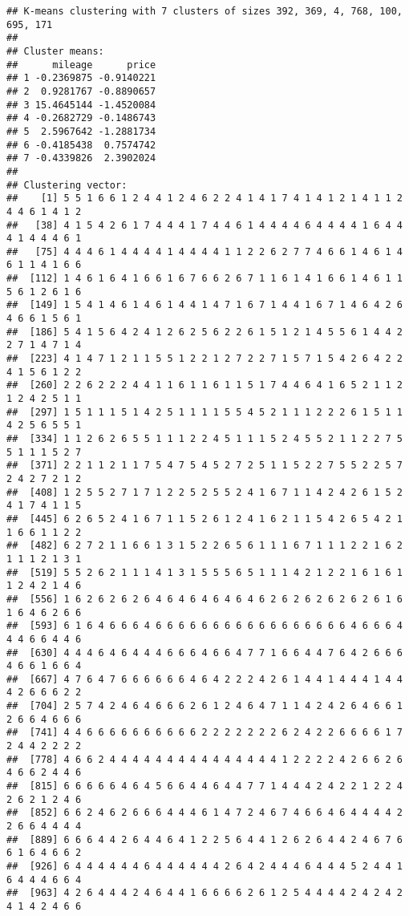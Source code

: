 \documentclass[
]{article}
\begin{document}
\begin{verbatim}
## K-means clustering with 7 clusters of sizes 392, 369, 4, 768, 100, 695, 171
## 
## Cluster means:
##      mileage      price
## 1 -0.2369875 -0.9140221
## 2  0.9281767 -0.8890657
## 3 15.4645144 -1.4520084
## 4 -0.2682729 -0.1486743
## 5  2.5967642 -1.2881734
## 6 -0.4185438  0.7574742
## 7 -0.4339826  2.3902024
## 
## Clustering vector:
##    [1] 5 5 1 6 6 1 2 4 4 1 2 4 6 2 2 4 1 4 1 7 4 1 4 1 2 1 4 1 1 2 4 4 6 1 4 1 2
##   [38] 4 1 5 4 2 6 1 7 4 4 4 1 7 4 4 6 1 4 4 4 4 6 4 4 4 4 1 6 4 4 4 1 4 4 4 6 1
##   [75] 4 4 4 6 1 4 4 4 4 1 4 4 4 4 1 1 2 2 6 2 7 7 4 6 6 1 4 6 1 4 6 1 1 4 1 6 6
##  [112] 1 4 6 1 6 4 1 6 6 1 6 7 6 6 2 6 7 1 1 6 1 4 1 6 6 1 4 6 1 1 5 6 1 2 6 1 6
##  [149] 1 5 4 1 4 6 1 4 6 1 4 4 1 4 7 1 6 7 1 4 4 1 6 7 1 4 6 4 2 6 4 6 6 1 5 6 1
##  [186] 5 4 1 5 6 4 2 4 1 2 6 2 5 6 2 2 6 1 5 1 2 1 4 5 5 6 1 4 4 2 2 7 1 4 7 1 4
##  [223] 4 1 4 7 1 2 1 1 5 5 1 2 2 1 2 7 2 2 7 1 5 7 1 5 4 2 6 4 2 2 4 1 5 6 1 2 2
##  [260] 2 2 6 2 2 2 4 4 1 1 6 1 1 6 1 1 5 1 7 4 4 6 4 1 6 5 2 1 1 2 1 2 4 2 5 1 1
##  [297] 1 5 1 1 1 5 1 4 2 5 1 1 1 1 5 5 4 5 2 1 1 1 2 2 2 6 1 5 1 1 4 2 5 6 5 5 1
##  [334] 1 1 2 6 2 6 5 5 1 1 1 2 2 4 5 1 1 1 5 2 4 5 5 2 1 1 2 2 7 5 5 1 1 1 5 2 7
##  [371] 2 2 1 1 2 1 1 7 5 4 7 5 4 5 2 7 2 5 1 1 5 2 2 7 5 5 2 2 5 7 2 4 2 7 2 1 2
##  [408] 1 2 5 5 2 7 1 7 1 2 2 5 2 5 5 2 4 1 6 7 1 1 4 2 4 2 6 1 5 2 4 1 7 4 1 1 5
##  [445] 6 2 6 5 2 4 1 6 7 1 1 5 2 6 1 2 4 1 6 2 1 1 5 4 2 6 5 4 2 1 1 6 6 1 1 2 2
##  [482] 6 2 7 2 1 1 6 6 1 3 1 5 2 2 6 5 6 1 1 1 6 7 1 1 1 2 2 1 6 2 1 1 1 2 1 3 1
##  [519] 5 5 2 6 2 1 1 1 4 1 3 1 5 5 5 6 5 1 1 1 4 2 1 2 2 1 6 1 6 1 1 2 4 2 1 4 6
##  [556] 1 6 2 6 2 6 2 6 4 6 4 6 4 6 4 6 4 6 2 6 2 6 2 6 2 6 2 6 1 6 1 6 4 6 2 6 6
##  [593] 6 1 6 4 6 6 6 4 6 6 6 6 6 6 6 6 6 6 6 6 6 6 6 6 6 4 6 6 6 4 4 4 6 6 4 4 6
##  [630] 4 4 4 6 4 6 4 4 4 6 6 6 4 6 6 4 7 7 1 6 6 4 4 7 6 4 2 6 6 6 4 6 6 1 6 6 4
##  [667] 4 7 6 4 7 6 6 6 6 6 6 4 6 4 2 2 2 4 2 6 1 4 4 1 4 4 4 1 4 4 4 2 6 6 6 2 2
##  [704] 2 5 7 4 2 4 6 4 6 6 6 2 6 1 2 4 6 4 7 1 1 4 2 4 2 6 4 6 6 1 2 6 6 4 6 6 6
##  [741] 4 4 6 6 6 6 6 6 6 6 6 6 2 2 2 2 2 2 2 6 2 4 2 2 6 6 6 6 1 7 2 4 4 2 2 2 2
##  [778] 4 6 6 2 4 4 4 4 4 4 4 4 4 4 4 4 4 4 4 1 2 2 2 2 4 2 6 6 2 6 4 6 6 2 4 4 6
##  [815] 6 6 6 6 6 4 6 4 5 6 6 4 4 6 4 4 7 7 1 4 4 4 2 4 2 2 1 2 2 4 2 6 2 1 2 4 6
##  [852] 6 6 2 4 6 2 6 6 6 4 4 4 6 1 4 7 2 4 6 7 4 6 6 4 6 4 4 4 4 2 2 6 6 4 4 4 4
##  [889] 6 6 6 4 4 2 6 4 4 6 4 1 2 2 5 6 4 4 1 2 6 2 6 4 4 2 4 6 7 6 6 1 6 4 6 6 2
##  [926] 6 4 4 4 4 4 4 6 4 4 4 4 4 4 2 6 4 2 4 4 4 6 4 4 4 5 2 4 4 1 6 4 4 4 6 6 4
##  [963] 4 2 6 4 4 4 2 4 6 4 4 1 6 6 6 6 2 6 1 2 5 4 4 4 4 2 4 2 4 2 4 1 4 2 4 6 6

\end{verbatim}
\end{document}

